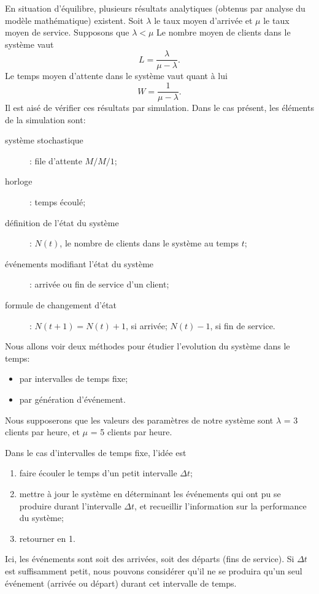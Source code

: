 \begin{example}
En situation d'équilibre, plusieurs résultats analytiques (obtenus par analyse du modèle mathématique) existent.
Soit $\lambda$ le taux moyen d'arrivée et $\mu$ le taux moyen de service.
Supposons que $\lambda < \mu$
Le nombre moyen de clients dans le système vaut
\[
L = \frac{\lambda}{\mu-\lambda}.
\]
Le temps moyen d'attente dans le système vaut quant à lui
\[
W = \frac{1}{\mu-\lambda}.
\]
Il est aisé de vérifier ces résultats par simulation.
Dans le cas présent, les éléments de la simulation sont:
\begin{description}
\item[système stochastique]: file d'attente $M/M/1$;
\item[horloge] : temps écoulé;
\item[définition de l'état du système]: $N(t)$, le nombre de clients dans le système au temps $t$;
\item[événements modifiant l'état du système]: arrivée ou fin de service d'un client;
\item[formule de changement d'état] : $N(t+1) = N(t) + 1$, si arrivée; $N(t) - 1$, si fin de service.
\end{description}
Nous allons voir deux méthodes pour étudier l'evolution du système dans le temps:
\begin{itemize}
\item
 par intervalles de temps fixe;
\item
 par génération d'événement.
\end{itemize}
Nous supposerons que les valeurs des paramètres de notre système sont $\lambda$ = 3 clients par heure, et $\mu$ = 5 clients par heure.

Dans le cas d'intervalles de temps fixe, l'idée est
\begin{enumerate}
\item
faire écouler le temps d'un petit intervalle $\Delta t$;
\item
mettre à jour le système en déterminant les événements qui ont pu se produire durant l'intervalle
$\Delta t$, et recueillir l'information sur la performance du système;
\item
retourner en 1.
\end{enumerate}
Ici, les événements sont soit des arrivées, soit des départs (fins de service).
Si $\Delta t$ est suffisamment petit, nous pouvons considérer qu'il ne se produira qu'un seul événement (arrivée ou départ) durant cet intervalle de temps.


\end{example}
